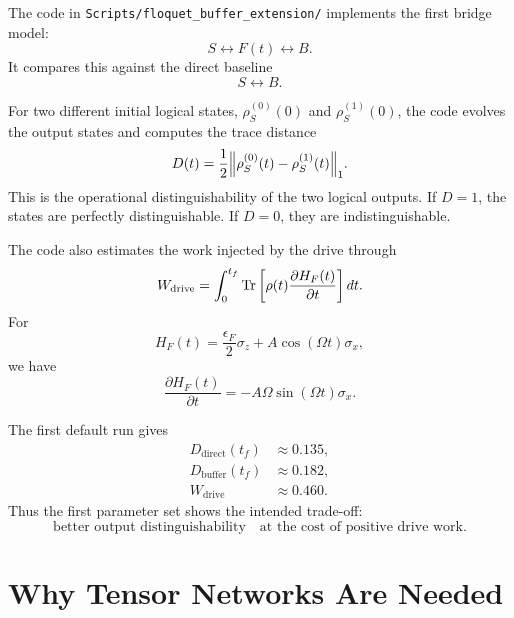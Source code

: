 \documentclass[11pt]{article}
\begin{document}
The code in \texttt{Scripts/floquet\_buffer\_extension/} implements the first bridge model:
\begin{equation}
    S \longleftrightarrow F(t) \longleftrightarrow B.
\end{equation}
It compares this against the direct baseline
\begin{equation}
    S \longleftrightarrow B.
\end{equation}

For two different initial logical states, $\rho_S^{(0)}(0)$ and $\rho_S^{(1)}(0)$, the code evolves
the output states and computes the trace distance
\begin{equation}
    D(t)
    =
    \frac{1}{2}
    \norm{
        \rho_S^{(0)}(t)
        -
        \rho_S^{(1)}(t)
    }_1.
\end{equation}
This is the operational distinguishability of the two logical outputs.  If $D=1$, the states are
perfectly distinguishable.  If $D=0$, they are indistinguishable.

The code also estimates the work injected by the drive through
\begin{equation}
    W_{\mathrm{drive}}
    =
    \int_0^{t_f}
    \Tr\left[
        \rho(t)
        \frac{\partial H_F(t)}{\partial t}
    \right]dt.
\end{equation}
For
\begin{equation}
    H_F(t)
    =
    \frac{\epsilon_F}{2}\sigma_z
    +
    A\cos(\Omega t)\sigma_x,
\end{equation}
we have
\begin{equation}
    \frac{\partial H_F(t)}{\partial t}
    =
    -
    A\Omega\sin(\Omega t)\sigma_x.
\end{equation}

The first default run gives
\begin{align}
    D_{\mathrm{direct}}(t_f)
    &\approx
    0.135,
    \\
    D_{\mathrm{buffer}}(t_f)
    &\approx
    0.182,
    \\
    W_{\mathrm{drive}}
    &\approx
    0.460.
\end{align}
Thus the first parameter set shows the intended trade-off:
\begin{equation}
    \text{better output distinguishability}
    \quad
    \text{at the cost of positive drive work.}
\end{equation}

\section{Why Tensor Networks Are Needed}
\end{document}
